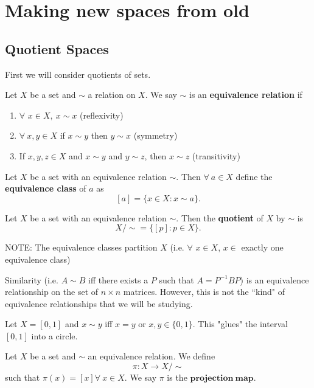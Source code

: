 

\chapter{Making new spaces from old} 
\section{Quotient Spaces}

First we will consider quotients of sets. 
\begin{definition}
	Let $X$ be a set and $\sim$ a relation on $X$. We say $\sim$ is an {\bf equivalence relation} if 
	\begin{enumerate}
		\item $\forall$ $x \in X, \ x\sim x$ (reflexivity) 
		\item $\forall \ x, y \in X$ if $x\sim y$ then $y\sim x$ (symmetry) 
		\item If $x, y, z \in X$ and $x\sim y$ and $y\sim z$, then $x\sim z$ (transitivity) 
	\end{enumerate}
\end{definition}
\begin{definition}
	Let $X$ be a set with an equivalence relation $\sim$. Then $\forall \ a \in X$ define the {\bf equivalence class} of $a$ as
	\[[a] = \{x \in X : x\sim a \}.\]
\end{definition}
\begin{definition}
	Let $X$ be a set with an equivalence relation $\sim$. Then the {\bf quotient} of $X$ by $\sim$ is
	\[X / \sim = \{ [p] : p \in X\}.\]
\end{definition}
NOTE: The equivalence classes partition $X$ (i.e. $\forall$ $x \in X$, $x \in$ exactly one equivalence class)
\begin{example}
	Similarity (i.e. $A \sim B$ iff there exists a $P$ such that $A = P^{-1}BP$) is an equivalence relationship on the set of $n \times n$ matrices. However, this is not the ``kind" of equivalence relationships that we will be studying. 
\end{example}
\begin{example}
	Let $X = [0,1]$ and $x\sim y$ iff $x = y$ or $x,y \in \{0,1\}$. This "glues" the interval $[0,1]$ into a circle. 
\end{example}
\begin{definition}
	Let $X$ be a set and $\sim$ an equivalence relation. We define $$\pi: X \rightarrow X / \sim$$ such that $\pi(x) = [x] \forall \ x \in X$. We say $\pi$ is the $\mathbf{projection \ map}$. 
\end{definition}
